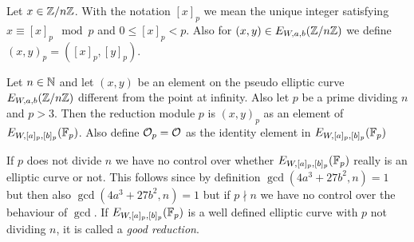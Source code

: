 Let $x\in\mathbb{Z}/n\mathbb{Z}$. With the notation $[x]_p$ we mean the unique integer satisfying $x\equiv [x]_p\mod p$ and $0\leq [x]_p < p$. Also for $(x,y)\in E_{W,a,b}(\mathbb{Z}/n\mathbb{Z})$ we define $(x,y)_p=([x]_p,[y]_p)$. 
\begin{defn}\label{def:redModp}
Let $n\in\mathbb{N}$ and let $(x,y)$ be an element on the pseudo elliptic curve $E_{W,a,b}(\mathbb{Z}/n\mathbb{Z})$ different from the point at infinity. Also let $p$ be a prime dividing $n$ and $p>3$. Then the reduction module $p$ is $(x,y)_p$ as an element of $E_{W,[a]_p,[b]_p}(\mathbb{F}_p)$. Also define $\mathcal{O}_p=\mathcal{O}$ as the identity element in $E_{W,[a]_p,[b]_p}(\mathbb{F}_p)$
\end{defn}
If $p$ does not divide $n$ we have no control over whether $E_{W,[a]_p,[b]_p}(\mathbb{F}_p)$ really is an elliptic curve or not. This follows since by definition $\gcd(4a^3+27b^2,n)=1$ but then also $\gcd(4a^3+27b^2,n)=1$ but if $p\nmid n$ we have no control over the behaviour of $\gcd$. If $E_{W,[a]_p,[b]_p}(\mathbb{F}_p)$ is a well defined elliptic curve with $p$ not dividing $n$, it is called a \textit{good reduction}. 

